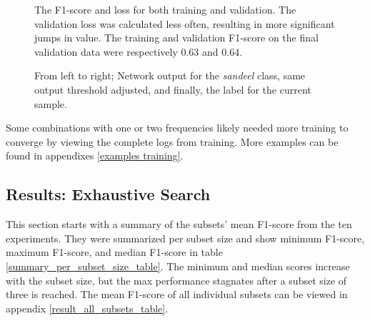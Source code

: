         \begin{figure}[H]
            \centering
            \qquad
            \caption[Loss and F1 score during training]{The F1-score and loss for both training and validation. The validation loss was calculated less often, resulting in more significant jumps in value. The training and validation F1-score on the final validation data were respectively 0.63 and 0.64.}%
            \label{loss_f1_duo_plot_fig}%
        \end{figure}
        \begin{figure}[H]
            \centering
            
            \caption[Example output, threshold and label]{From left to right; Network output for the \textit{sandeel} class, same output threshold adjusted, and finally, the label for the current sample.}
          	\medskip 
            \label{sandeel_threshold_label}
        \end{figure}
    
    
     Some combinations with one or two frequencies likely needed more training to converge by viewing the complete logs from training. More examples can be found in appendixes \ref{examples training}.
    

\subsection{Results: Exhaustive Search}
    This section starts with a summary of the subsets' mean F1-score from the ten experiments. They were summarized per subset size and show minimum F1-score, maximum F1-score, and median F1-score in table \ref{summary_per_subset_size_table}. The minimum and median scores increase with the subset size, but the max performance stagnates after a subset size of three is reached. The mean F1-score of all individual subsets can be viewed in appendix \ref{result_all_subsets_table}. 


